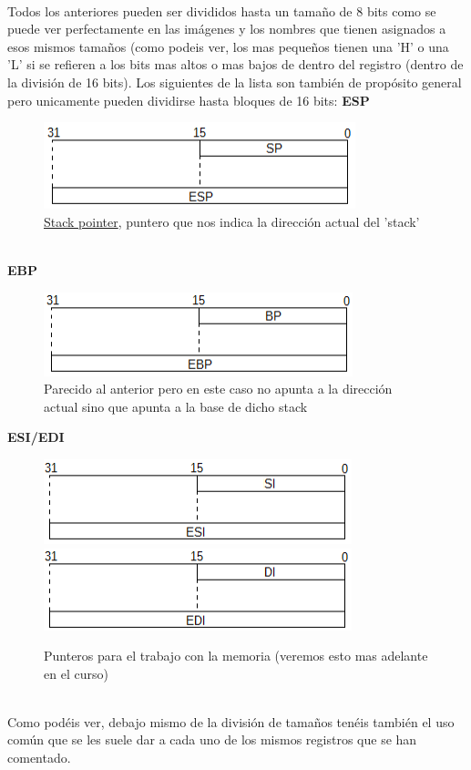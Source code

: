 \documentclass{fennix}
\begin{document}
\\
Todos los anteriores pueden ser divididos hasta un tamaño de 8 bits como se puede ver perfectamente en las imágenes y los nombres que tienen asignados a esos mismos tamaños (como podeis ver, los mas pequeños tienen una 'H' o una 'L' si se refieren a los bits mas altos o mas bajos de dentro del registro (dentro de la división de 16 bits).
Los siguientes de la lista son también de propósito general pero unicamente pueden dividirse hasta bloques de 16 bits:
\textbf{ESP}
\begin{figure}[h]
	\includegraphics{esp}
	\centering
	\caption{\underline{Stack pointer}, puntero que nos indica la dirección actual del 'stack'}
\end{figure}
\\
\textbf{EBP}
\begin{figure}[h]
	\includegraphics{ebp}
	\centering
	\caption{Parecido al anterior pero en este caso no apunta a la dirección actual sino que apunta a la base de dicho stack}
\end{figure}
\newpage
\textbf{ESI/EDI}
\begin{figure}[h]
	\includegraphics{esi}
	\includegraphics{edi}
	\centering
	\caption{Punteros para el trabajo con la memoria (veremos esto mas adelante en el curso)}
\end{figure}
\\
Como podéis ver, debajo mismo de la división de tamaños tenéis también el uso común que se les suele dar a cada uno de los mismos registros que se han comentado.
\end{document}
